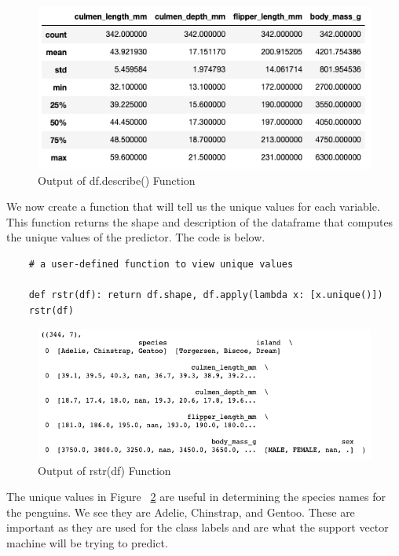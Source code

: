 \documentclass[12pt]{article}
\begin{document}
\begin{figure}[H]
    \centering
    \includegraphics[width=5in]{Figures/penguins/df.describe().png}
    \caption{Output of df.describe() Function}
    \label{fig_df.describe()}
\end{figure}

We now create a function that will tell us the unique values for each variable. This function returns the shape and description of the dataframe that computes the unique values of the predictor. The code is below.

\begin{verbatim}
    # a user-defined function to view unique values

    def rstr(df): return df.shape, df.apply(lambda x: [x.unique()])
    rstr(df)
\end{verbatim}

\begin{figure}[H]
    \centering
    \includegraphics[width=5in]{Figures/penguins/rstr(df).png}
    \caption{Output of rstr(df) Function}
    \label{fig_rstr(df)}
\end{figure}

The unique values in Figure ~\ref{fig_rstr(df)} are useful in determining the species names for the penguins. We see they are Adelie, Chinstrap, and Gentoo. These are important as they are used for the class labels and are what the support vector machine will be trying to predict.
\end{document}
